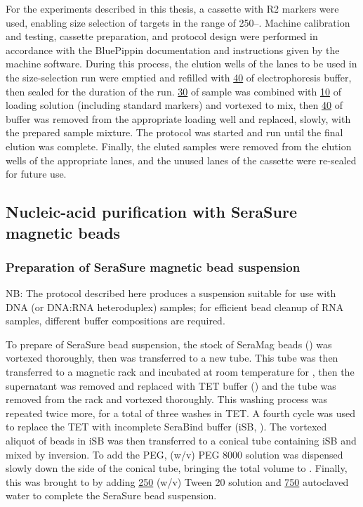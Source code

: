 For the experiments described in this thesis, a  cassette with R2 markers were used, enabling size selection of targets in the range of 250--. %
Machine calibration and testing, cassette preparation, and protocol design were performed in accordance with the BluePippin documentation and instructions given by the machine software. During this process, the elution wells of the lanes to be used in the size-selection run were emptied and refilled with \ul{40} of electrophoresis buffer, then sealed for the duration of the run. %
\ul{30} of sample was combined with \ul{10} of loading solution (including standard markers) and vortexed to mix, then \ul{40} of buffer was removed from the appropriate loading well and replaced, slowly, with the prepared sample mixture. The protocol was started and run until the final elution was complete. Finally, the eluted samples were removed from the elution wells of the appropriate lanes, and the unused lanes of the cassette were re-sealed for future use.


\subsection{Nucleic-acid purification with SeraSure magnetic beads}

\subsubsection{Preparation of SeraSure magnetic bead suspension}

NB: The protocol described here produces a suspension suitable for use with DNA (or DNA:RNA heteroduplex) samples; for efficient bead cleanup of RNA samples, different buffer compositions are required.

To prepare  of SeraSure bead suspension, the stock of SeraMag beads () was vortexed thoroughly, then  was transferred to a new tube. This tube was then transferred to a magnetic rack and incubated at room temperature for , then the supernatant was removed and replaced with  TET buffer () and the tube was removed from the rack and vortexed thoroughly. This washing process was repeated twice more, for a total of three washes in TET. A fourth cycle was used to replace the TET with incomplete SeraBind buffer (iSB, ). The vortexed  aliquot of beads in iSB was then transferred to a conical tube containing  iSB and mixed by inversion. To add the PEG,   (w/v) PEG 8000 solution was dispensed slowly down the side of the conical tube, bringing the total volume to . Finally, this was brought to  by adding \ul{250}  (w/v) Tween 20 solution and \ul{750} autoclaved water to complete the SeraSure bead suspension.

